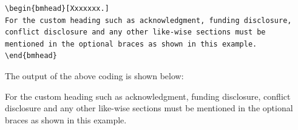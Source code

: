\documentclass[lineno]{JFM-FLM_Au}
\begin{document}
\begin{verbatim}
\begin{bmhead}[Xxxxxxx.]
For the custom heading such as acknowledgment, funding disclosure,
conflict disclosure and any other like-wise sections must be
mentioned in the optional braces as shown in this example.
\end{bmhead}
\end{verbatim}
The output of the above coding is shown below:

\begin{bmhead}[Xxxxxxx.]
For the custom heading such as acknowledgment, funding disclosure,
conflict disclosure and any other like-wise sections must be
mentioned in the optional braces as shown in this example.
\end{bmhead}

%
%
%
%
%
%
\end{document}
